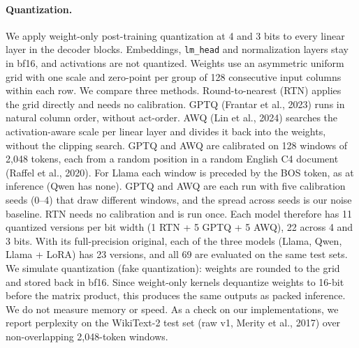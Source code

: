 \documentclass[11pt]{article}
\begin{document}
\paragraph{Quantization.} We apply weight-only post-training quantization at 4 and 3 bits to every linear layer in the decoder blocks. Embeddings, \texttt{lm\_head} and normalization layers stay in bf16, and activations are not quantized. Weights use an asymmetric uniform grid with one scale and zero-point per group of 128 consecutive input columns within each row. We compare three methods. Round-to-nearest (RTN) applies the grid directly and needs no calibration. GPTQ (Frantar et al., 2023) runs in natural column order, without act-order. AWQ (Lin et al., 2024) searches the activation-aware scale per linear layer and divides it back into the weights, without the clipping search.
GPTQ and AWQ are calibrated on 128 windows of 2,048 tokens, each from a random position in a random English C4 document (Raffel et al., 2020). For Llama each window is preceded by the BOS token, as at inference (Qwen has none). GPTQ and AWQ are each run with five calibration seeds (0–4) that draw different windows, and the spread across seeds is our noise baseline. RTN needs no calibration and is run once. Each model therefore has 11 quantized versions per bit width (1 RTN + 5 GPTQ + 5 AWQ), 22 across 4 and 3 bits. With its full-precision original, each of the three models (Llama, Qwen, Llama + LoRA) has 23 versions, and all 69 are evaluated on the same test sets. 
We simulate quantization (fake quantization): weights are rounded to the grid and stored back in bf16. Since weight-only kernels dequantize weights to 16-bit before the matrix product, this produces the same outputs as packed inference. We do not measure memory or speed. As a check on our implementations, we report perplexity on the WikiText-2 test set (raw v1, Merity et al., 2017) over non-overlapping 2,048-token windows.

\begin{table}[htbp]
\centering
\small
{}
\caption{WikiText-2 test perplexity (lower is better). FP is the full-precision model. GPTQ and AWQ show the mean $\pm$ standard deviation over the five calibration seeds. FP and RTN are run once.}
\end{table}
\end{document}

